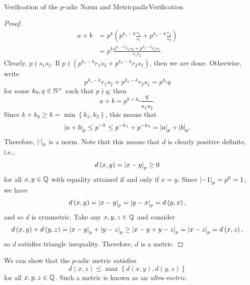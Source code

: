 \documentclass[math]{amznotes}
\theoremstyle{remark}
\begin{document}
\begin{probox}{Verification of the $p$-adic Norm and Metric}{padicVerification}
\begin{proof}
        \begin{align*}
            a + b & = p^{k}\left(p^{k_1 - k}\frac{r_1}{s_1} + p^{k_2 - k}\frac{r_2}{s_2}\right) \\
            & = p^{k}\frac{p^{k_1 - k}r_1s_2 + p^{k_2 - k}r_2s_1}{s_1s_2}.
        \end{align*}
        Clearly, $p \nmid s_1s_2$. If $p \nmid \left(p^{k_1 - k}r_1s_2 + p^{k_2 - k}r_2s_1\right)$, then we are done. Otherwise, write 
        \begin{equation*}
            p^{k_1 - k}r_1s_2 + p^{k_2 - k}r_2s_1 = p^{k_0}q
        \end{equation*}
        for some $k_0, q \in \mathbb{N}^+$ such that $p \nmid q$, then 
        \begin{equation*}
            a + b = p^{k + k_0}\frac{q}{s_1s_2}.
        \end{equation*}
        Since $k + k_0 \geq k = \min\left\{k_1, k_2\right\}$, this means that 
        \begin{equation*}
            {\left\lvert {a + b} \right\rvert}_p \leq p^{-k} \leq p^{-k_1} + p^{-k_2} = {\left\lvert {a} \right\rvert}_p + {\left\lvert {b} \right\rvert}_p.
        \end{equation*}
        Therefore, ${\left\lvert {\cdot} \right\rvert}_p$ is a norm. Note that this means that $d$ is clearly positive definite, i.e.,
        \begin{equation*}
            d\left(x, y\right) = {\left\lvert {x - y} \right\rvert}_p \geq 0
        \end{equation*}
        for all $x, y \in \mathbb{Q}$ with equality attained if and only if $x = y$. Since ${\left\lvert {-1} \right\rvert}_p = p^0 = 1$, we have
        \begin{equation*}
            d\left(x, y\right) = {\left\lvert {x - y} \right\rvert}_p = {\left\lvert {y - x} \right\rvert}_p = d\left(y, x\right),
        \end{equation*}
        and so $d$ is symmetric. Take any $x, y, z \in \mathbb{Q}$ and consider 
        \begin{equation*}
            d\left(x, y\right) + d\left(y, z\right) = {\left\lvert {x - y} \right\rvert}_p + {\left\lvert {y - z} \right\rvert}_p \geq {\left\lvert {x - y + y - z} \right\rvert}_p = {\left\lvert {x - z} \right\rvert}_p = d\left(x, z\right),
        \end{equation*}
        so $d$ satisfies triangle inequality. Therefore, $d$ is a metric.
    \end{proof}
\end{probox}
We can show that the $p$-adic metric satisfies 
\begin{equation*}
    d\left(x, z\right) \leq \max\left\{d\left(x, y\right), d\left(y, z\right)\right\}
\end{equation*}
for all $x, y, z \in \mathbb{Q}$. Such a metric is known as an \textit{ultra-metric}.
\end{document}
